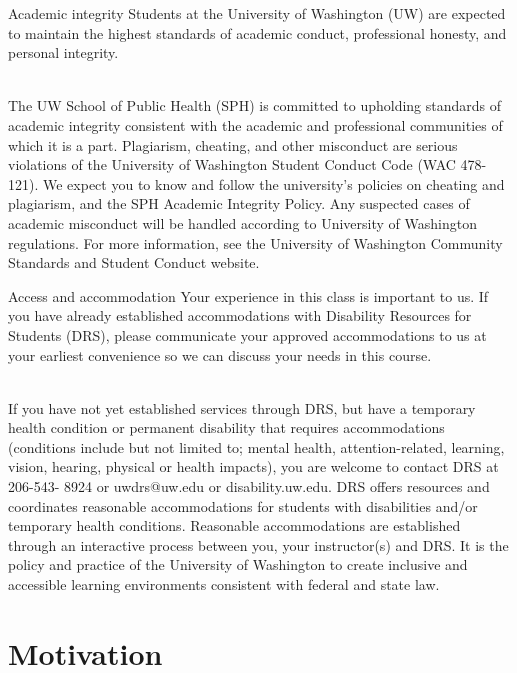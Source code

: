 \documentclass{beamer}
\begin{document}
\begin{frame}{Academic integrity}
Students at the University of Washington (UW) are expected to maintain the highest standards of academic conduct, professional honesty, and personal integrity.
 \\~\

The UW School of Public Health (SPH) is committed to upholding standards of academic integrity consistent with the academic and professional communities of which it is a part. Plagiarism, cheating, and other misconduct are serious violations of the University of Washington Student Conduct Code (WAC 478-121). We expect you to know and follow the university’s policies on cheating and plagiarism, and the SPH Academic Integrity Policy. Any suspected cases of academic misconduct will be handled according to University of Washington regulations. For more information, see the University of Washington Community Standards and Student Conduct website.

\end{frame}

\begin{frame}{Access and accommodation}
\small Your experience in this class is important to us. If you have already established accommodations with Disability Resources for Students (DRS), please communicate your approved accommodations to us at your earliest convenience so we can discuss your needs in this course.
\\~\

\small If you have not yet established services through DRS, but have a temporary health condition or permanent disability that requires accommodations (conditions include but not limited to; mental health, attention-related, learning, vision, hearing, physical or health impacts), you are welcome to contact DRS at 206-543- 8924 or uwdrs@uw.edu or disability.uw.edu. DRS offers resources and coordinates reasonable accommodations for students with disabilities and/or temporary health conditions. Reasonable accommodations are established through an interactive process between you, your instructor(s) and DRS. It is the policy and practice of the University of Washington to create inclusive and accessible learning environments consistent with federal and state law.

\end{frame}

\section{Motivation}
\end{document}
